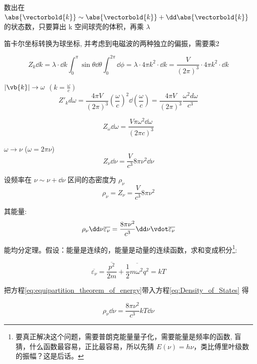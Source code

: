 数出在 $\abs{\vectorbold{k}} \sim \abs{\vectorbold{k}} + \dd \abs{\vectorbold{k}}$ 的状态数，只要算出 k 空间球壳的体积，再乘 $\lambda$

笛卡尔坐标转换为球坐标, 并考虑到电磁波的两种独立的偏振，需要乘2

\begin{equation}
	Z_k \dd k = \lambda \cdot \dd k \int_{0 }^{\pi } \sin\theta \dd{\theta}   \int_{0 }^{2\pi } \dd{\phi}  = \lambda \cdot 4 \pi k^2 \cdot \dd k = \frac{V}{(2 \pi)^3} \cdot 4 \pi k^2 \cdot \dd k
\end{equation}

$|\vb{k}| \to \omega $ $(k=\frac{\omega}{c})$
\begin{equation}
	Z'_k d\omega = \frac{4 \pi V}{(2 \pi)^3} \left(\frac{\omega}{c}\right)^2 \dd{\left(\frac{\omega}{c}\right)}  = \frac{4 \pi V}{(2 \pi )^{3}} \frac{\omega^2 d\omega}{c^3}
\end{equation}

\begin{equation*}
	Z_\omega \dd\omega = \frac{V \pi \omega^2 \dd\omega}{(2 \pi c)^3}
\end{equation*}

$ \omega \to \nu $ ($\omega = 2 \pi \nu$)
\begin{equation*}
	Z_\nu \dd \nu = \frac{V}{c^3} 8 \pi \nu^2 \dd \nu
\end{equation*}

设频率在 $\nu \sim \nu + \dd \nu$ 区间的态密度为 $\rho_\nu$
\begin{equation*}
	\rho_\nu = Z_\nu = \frac{V}{c^3} 8 \pi \nu^2 
\end{equation*}

其能量:
\begin{equation}
	\label{eq:Density_of_States}
	\rho_\nu \dd \nu \overline{\varepsilon_\nu}= \frac{8 \pi \nu^2}{c^3} \dd \nu \vdot \overline{\varepsilon_\nu}
\end{equation}

能均分定理。假设：能量是连续的，能量是动量的连续函数，求和变成积分\footnote{要真正解决这个问题，需要普朗克能量量子化，需要能量是频率的函数, 盲猜，什么函数最容易，正比最容易，所以先猜 $E(\nu)=h\nu$，类比傅里叶级数的振幅？这是后话。}:


\begin{equation}
	\label{eq:equipartition_theorem_of_energy}
	\overline{\varepsilon_\nu} = \frac{\overline{p^2} }{2m} + \overline{\frac{1}{2}m\omega^2q^2} = kT
\end{equation}

把方程\eqref{eq:equipartition_theorem_of_energy}带入方程\eqref{eq:Density_of_States}  得

\begin{equation}
	\rho_\nu \dd\nu = \frac{8 \pi \nu^2}{c^3} kT \dd \nu
\end{equation}

